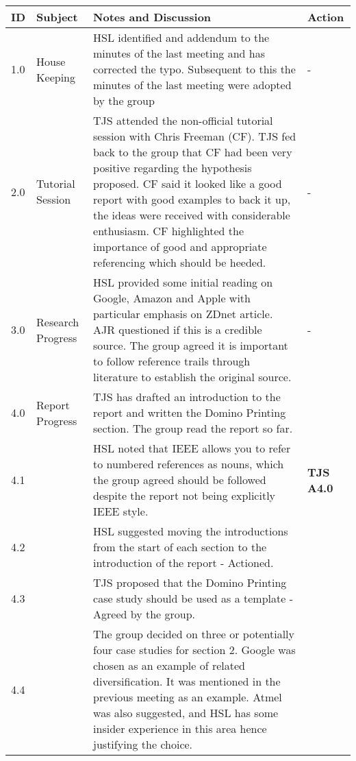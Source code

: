 \begin{center}
\begin{longtable}{| p{} |>{\raggedright\arraybackslash}p{} | p{} |>{\raggedright\arraybackslash}p{}|} \hline
\textbf{ID} & \textbf{Subject} & \textbf{Notes and Discussion} & \textbf{Action} \\ \hline
\endhead
1.0	&	House Keeping	&	HSL identified and addendum to the minutes of the last meeting and has corrected the typo. 
						Subsequent to this the minutes of the last meeting were adopted by the group								&	- \\ \hline
2.0	&	Tutorial Session	&	TJS attended the non-official tutorial session with Chris Freeman (CF). 
						TJS fed back to the group that CF had been very positive regarding the hypothesis proposed. 
						CF said it looked like a good report with good examples to back it up, the ideas were received with considerable enthusiasm. 
						CF highlighted the importance of good and appropriate referencing which should be heeded.						&	- \\ \hline
3.0	&	Research Progress	&	HSL provided some initial reading on Google, Amazon and Apple with particular emphasis on ZDnet article.
						AJR questioned if this is a credible source. 
						The group agreed it is important to follow reference trails through literature to establish the original source.			 &	- \\ \hline
4.0	&	Report Progress	&	TJS has drafted an introduction to the report and written the Domino Printing section. 
						The group read the report so far. 														 & 	   \\
4.1     &        				&	HSL noted that IEEE allows you to refer to numbered references as nouns, which the group agreed should be followed despite the report not being explicitly IEEE style.  &	\textbf{TJS A4.0} \\ 
4.2	&				&	HSL suggested moving the introductions from the start of each section to the introduction of the report - Actioned.		&\\
4.3	&				&	TJS proposed that the Domino Printing case study should be used as a template - Agreed by the group.				&	   \\
4.4	&				&	The group decided on three or potentially four case studies for section 2. 
						Google was chosen as an example of related diversification. 
						It was mentioned in the previous meeting as an example. 
						Atmel was also suggested, and HSL has some insider experience in this area hence justifying the choice. 

\end{longtable}
\end{center}
